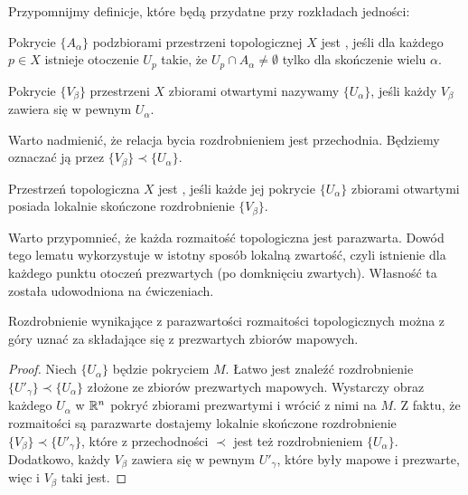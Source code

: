 Przypomnijmy definicje, które będą przydatne przy rozkładach jedności:

\begin{definition} Pokrycie $\{A_\alpha\}$ podzbiorami przestrzeni topologicznej $X$ jest , jeśli dla każdego $p\in X$ istnieje otoczenie $U_p$ takie, że $U_p\cap A_\alpha\neq\emptyset$ tylko dla skończenie wielu $\alpha$.
\end{definition}

\begin{definition}[rozdrobnienie] Pokrycie $\{V_\beta\}$ przestrzeni $X$ zbiorami otwartymi nazywamy  $\{U_\alpha\}$, jeśli każdy $V_\beta$ zawiera się w pewnym $U_\alpha$.
\end{definition}

Warto nadmienić, że relacja bycia rozdrobnieniem jest przechodnia. Będziemy oznaczać ją przez $\{V_\beta\}\prec\{U_\alpha\}$.

\begin{definition} Przestrzeń topologiczna $X$ jest , jeśli każde jej pokrycie $\{U_\alpha\}$ zbiorami otwartymi posiada lokalnie skończone rozdrobnienie $\{V_\beta\}$.
\end{definition}

Warto przypomnieć, że każda rozmaitość topologiczna jest parazwarta. Dowód tego lematu wykorzystuje w istotny sposób lokalną zwartość, czyli istnienie dla każdego punktu otoczeń prezwartych (po domknięciu zwartych). Własność ta została udowodniona na ćwiczeniach.

\begin{remark}\label{uwaga:2.4}
Rozdrobnienie wynikające z parazwartości rozmaitości topologicznych można z góry uznać za składające się z prezwartych zbiorów mapowych.
\end{remark}

\begin{proof}
Niech $\{U_\alpha\}$ będzie pokryciem $M$. Łatwo jest znaleźć rozdrobnienie $\{U'_\gamma\}\prec\{U_\alpha\}$ złożone ze zbiorów prezwartych mapowych. Wystarczy obraz każdego $U_\alpha$ w $\mathbb{R}^n$ pokryć zbiorami prezwartymi i wrócić z nimi na $M$. Z faktu, że rozmaitości są parazwarte dostajemy lokalnie skończone rozdrobnienie $\{V_\beta\}\prec\{U'_\gamma\}$, które z przechodności $\prec$ jest też rozdrobnieniem $\{U_\alpha\}$. Dodatkowo, każdy $V_\beta$ zawiera się w pewnym $U'_\gamma$, które były mapowe i prezwarte, więc i $V_\beta$ taki jest.
\end{proof}

